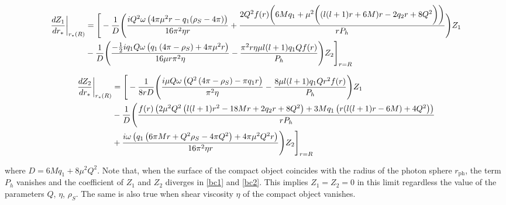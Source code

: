 \documentclass[aps,prd,twocolumn,floatfix,noshowpacs,tightenlines,noshowkeys,superscriptaddress,amsmath,amssymb,
nofootinbib]{revtex4-1}
\renewcommand\[{\begin{equation}}
\renewcommand\]{\end{equation}}
\begin{document}
\begin{widetext}
\begin{equation}\label{bc1}
\begin{aligned}
{\frac{d Z_{1}}{dr_{*}}}\bigg{|}_{r_*(R)}&=\Bigg[-\frac{1}{D}\Bigg(\frac{i Q^2 \omega\left(4 \pi  \mu ^2 r-q_1 (\text{$\rho_{S} $}-4 \pi )\right)}{16 \pi ^2 \eta  r}+\dfrac{2 Q^2 f(r) \bigg(6 M q_1+\mu ^2 \bigg((l(l+1) r+6 M)r-2 q_2 r+8 Q^2\bigg)\bigg)}{r P_h}\Bigg) Z_{1}\\
&-\frac{1}{D}\Bigg(\dfrac{-\frac{1}{2} i q_1 Q\omega \left(q_1 \left(4 \pi -\rho _S\right)+4 \pi  \mu ^2 r\right)}{16 \mu  r \pi ^2 \eta}-\dfrac{ \pi ^2 r\eta  \mu  l(l+1) q_1 Q f(r)}{P_h}\Bigg)Z_{2}\Bigg]_{r=R}
\end{aligned}
\end{equation}

\begin{equation}\label{bc2}
\begin{aligned}
{\frac{d Z_{2}}{dr_{*}}}\bigg{|}_{r_*(R)}&=\Bigg[-\dfrac{1}{8r D}\Bigg(\frac{i \mu  Q \omega\left(Q^2 \left(4 \pi -\rho _S\right)-\pi  q_1 r\right)}{\pi ^2 \eta }-\frac{8 \mu  l(l+1) q_1 Q r^2 f(r)}{P_h}\Bigg) Z_{1}\\
&-\frac{1}{D}\Bigg(\frac{f(r) \left(2 \mu ^2 Q^2 \left(l (l+1) r^2-18 M r+2 q_2 r+8 Q^2\right)+3 M q_1 \left(r (l (l+1) r-6 M)+4 Q^2\right)\right)}{r P_h}\\
&+\frac{i\omega \left(q_1 \left(6 \pi  M r+Q^2 \rho _S-4 \pi  Q^2\right)+4 \pi  \mu ^2 Q^2 r\right)}{16 \pi ^2 \eta  r}\Bigg)Z_{2}\Bigg]_{r=R}
\end{aligned}
\end{equation}
\end{widetext}
where  $D=6 M q_1+8 \mu ^2 Q^2$. Note that, when the surface of the compact object coincides with the radius of the photon sphere $r_{\textrm{ph}}$, the term $P_h$ vanishes and the coefficient of $Z_1$ and $Z_2$ diverges in \autoref{bc1} and \autoref{bc2}. This implies $Z_1=Z_2=0$ in this limit regardless the value of the parameters $Q$, $\eta$, $\rho_{S}$. The same is also true when shear viscosity $\eta$ of the compact object vanishes.  
\end{document}
